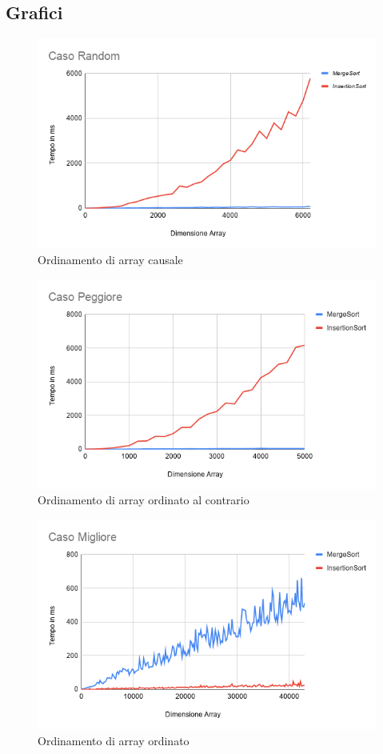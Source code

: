 \documentclass[12pt]{article}
\begin{document}
\subsection{Grafici}
\begin{figure}[H]
\includegraphics[width=\textwidth]{Caso Random.png}
\caption{Ordinamento di array causale}
\end{figure}
\begin{figure}[H]
\includegraphics[width=\textwidth]{Caso Peggiore.png}
\caption{Ordinamento di array ordinato al contrario}
\end{figure}
\begin{figure}[H]
\includegraphics[width=\textwidth]{Caso Migliore.png}
\caption{Ordinamento di array ordinato}
\end{figure}
\end{document}
